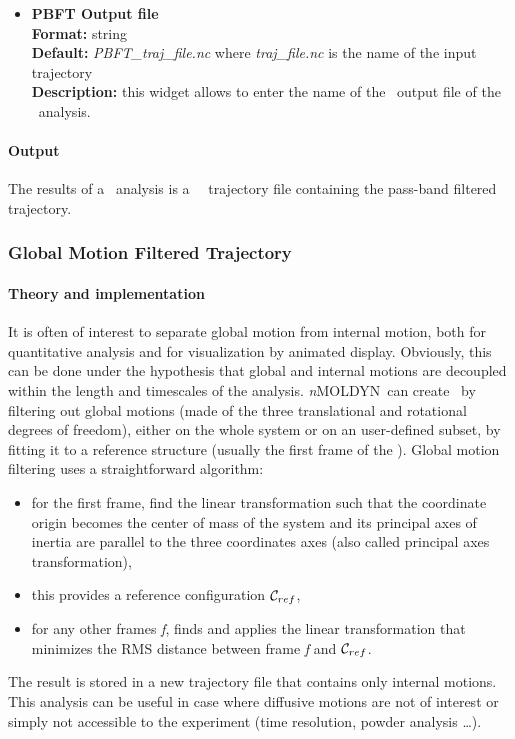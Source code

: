 \documentclass[a4paper,11pt]{report}
\newcommand{\NMOLDYN}{\textit{n}MOLDYN}
\begin{document}
\begin{itemize}
\item \textbf{PBFT Output file}\\
\textbf{Format:} string\\
\textbf{Default:} \textit{PBFT\_traj\_file.nc} where \textit{traj\_file.nc} is the name of the input trajectory\\
\textbf{Description:} this widget allows to enter the name of the \NetCDF\ output file of the \PBFT\ analysis.
\end{itemize}

\paragraph{Output\\}
The results of a \PBFT\ analysis is a \MMTK\ \NetCDF\ trajectory file containing the pass-band filtered trajectory.

\subsubsection{Global Motion Filtered Trajectory}
\label{gmft}
\paragraph{Theory and implementation\\}
\label{gmft_theory}
It is often of interest to separate global motion from internal motion, both for quantitative analysis 
and for visualization by animated display. Obviously, this can be done under the hypothesis that global and internal 
motions are decoupled within the length and timescales of the analysis. \NMOLDYN\ can create \GMFT\ by filtering out global 
motions (made of the three translational and rotational degrees of freedom), either on the whole system or on an user-defined subset, 
by fitting it to a reference structure (usually the first frame of the \MD). Global motion filtering uses a straightforward 
algorithm:
\begin{itemize}
\item for the first frame, find the linear transformation such that the coordinate origin becomes the center of mass of 
the system and its principal axes of inertia are parallel to the three coordinates axes (also called principal axes 
transformation),
\item this provides a reference configuration ${\cal C}_{ref}$,
\item for any other frames \textit{f}, finds and applies the linear transformation that minimizes the RMS distance between 
frame \textit{f} and ${\cal C}_{ref}$.
\end{itemize} 
The result is stored in a new trajectory file that contains only internal motions. This analysis can be useful in case where diffusive 
motions are not of interest or simply not accessible to the experiment (time resolution, powder analysis \ldots).
\end{document}
